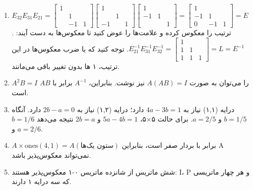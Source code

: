 \documentclass[12pt,a4paper]{article}
\begin{document}
{\begin{enumerate}
			\item $E_{32}E_{31}E_{21} = \begin{bmatrix} 1 & & \\ & 1 & \\ & -1 & 1 \end{bmatrix} \begin{bmatrix} 1 & & \\ & 1 & \\ -1 & & 1 \end{bmatrix} \begin{bmatrix} 1 & & \\ -1 & 1 & \\ & & 1 \end{bmatrix} = \begin{bmatrix} 1 & & \\ -1 & 1 & \\ 0 & -1 & 1 \end{bmatrix} = E$. ترتیب را معکوس کرده و علامت‌ها را عوض کنید تا معکوس‌ها به دست آیند: $E_{21}^{-1}E_{31}^{-1}E_{32}^{-1} = \begin{bmatrix} 1 & & \\ 1 & 1 & \\ 1 & 1 & 1 \end{bmatrix} = L=E^{-1}$. توجه کنید که با ضرب معکوس‌ها در این ترتیب، ۱ ها بدون تغییر باقی می‌مانند.
			
			\item $A^2B=I$ را می‌توان به صورت $A(AB)=I$ نیز نوشت. بنابراین، $A^{-1}$ برابر با $AB$ است.
			
			\item درایه (۱,۱) نیاز به $4a-3b=1$ دارد؛ درایه (۱,۲) نیاز به $2b-a=0$ دارد. آنگاه $b=1/5$ و $a=2/5$. برای حالت ۵×۵، $5a-4b=1$ و $2b=a$ نتیجه می‌دهد $b=1/6$ و $a=2/6$.
			
			\item $A \times \text{ones}(4,1) = A(\text{ستون یک‌ها})$ برابر با بردار صفر است، بنابراین A نمی‌تواند معکوس‌پذیر باشد.
			
			\item شش ماتریس از شانزده ماتریس ۰-۱ معکوس‌پذیر هستند: I، P و هر چهار ماتریسی که سه درایه ۱ دارند.
			

\end{enumerate}}
\end{document}
